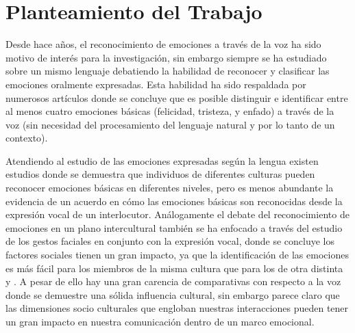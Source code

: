 \documentclass[11pt,a4paper,spanish]{book}
\begin{document}
\begin{comment}
		
		Regardless of how advanced technology has become, it is still in the early stages. Chatbots, voice assistants, and automated service interfaces frequently lack the ability to recognize when you are angry or upset, and that gap has kept AI from filling a more substantial role in things like customer service and sales.
		
		The problem is that words—the part of the conversation that AI can quantify and evaluate—aren’t enough. It’s less about what we say and more about how we say it. Studies have been conducted showing that the tone or intonation of your voice is far more indicative of your mood and mental state than the words you say.

		
	\end{comment}
	
	\section{Planteamiento del Trabajo}
	Desde hace años, el reconocimiento de emociones a través de la voz ha sido motivo de interés para la investigación, sin embargo siempre se ha estudiado sobre un mismo lenguaje debatiendo la habilidad de reconocer y clasificar las emociones oralmente expresadas. Esta habilidad ha sido respaldada por numerosos artículos donde se concluye que es posible distinguir e identificar entre al menos cuatro emociones básicas (felicidad, tristeza, y enfado) a través de la voz (sin necesidad del procesamiento del lenguaje natural y por lo tanto de un contexto).
	
	Atendiendo al estudio de las emociones expresadas según la lengua existen estudios donde se demuestra que individuos de diferentes culturas pueden reconocer emociones básicas en diferentes niveles, pero es menos abundante la evidencia de un acuerdo en cómo las emociones básicas son reconocidas desde la expresión vocal de un interlocutor.%
	Análogamente el debate del reconocimiento de emociones en un plano intercultural también se ha enfocado a través del estudio de los gestos faciales en conjunto con la expresión vocal, donde se concluye los factores sociales tienen un gran impacto, ya que la identificación de las emociones es más fácil para los miembros de la misma cultura que para los de otra distinta \cite{Pell2009a} y \cite{Pell2009}. A pesar de ello hay una gran carencia de comparativas con respecto a la voz donde se demuestre una sólida influencia cultural, sin embargo parece claro que las dimensiones socio culturales que engloban nuestras interacciones pueden tener un gran impacto en nuestra comunicación dentro de un marco emocional.
	
\end{document}
